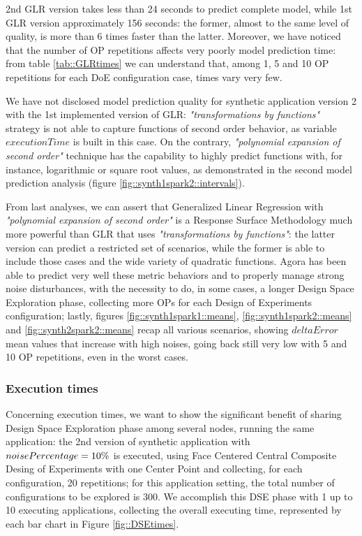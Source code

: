 2nd GLR version takes less than 24 seconds to predict complete model, while 1st GLR version approximately 156 seconds: the former, almost to the same level of quality, is more than 6 times faster than the latter. Moreover, we have noticed that the number of OP repetitions affects very poorly model prediction time: from table \ref{tab::GLRtimes} we can understand that, among 1, 5 and 10 OP repetitions for each DoE configuration case, times vary very few.

We have not disclosed model prediction quality for synthetic application version 2 with the 1st implemented version of GLR: \textit{"transformations by functions"} strategy is not able to capture functions of second order behavior, as variable $executionTime$ is built in this case. On the contrary, \textit{"polynomial expansion of second order"} technique has the capability to highly predict functions with, for instance, logarithmic or square root values, as demonstrated in the second model prediction analysis (figure \ref{fig::synth1spark2::intervals}).

From last analyses, we can assert that Generalized Linear Regression with \textit{"polynomial expansion of second order"} is a Response Surface Methodology much more powerful than GLR that uses \textit{"transformations by functions"}: the latter version can predict a restricted set of scenarios, while the former is able to include those cases and the wide variety of quadratic functions. Agora has been able to predict very well these metric behaviors and to properly manage strong noise disturbances, with the necessity to do, in some cases, a longer Design Space Exploration phase, collecting more OPs for each Design of Experiments configuration; lastly, figures \ref{fig::synth1spark1::means}, \ref{fig::synth1spark2::means} and \ref{fig::synth2spark2::means} recap all various scenarios, showing $deltaError$ mean values that increase with high noises, going back still very low with 5 and 10 OP repetitions, even in the worst cases.


\subsubsection{Execution times}

Concerning execution times, we want to show the significant benefit of sharing Design Space Exploration phase among several nodes, running the same application: the 2nd version of synthetic application with $noise\-Percentage = 10\%$ is executed, using Face Centered Central Composite Desing of Experiments with one Center Point and collecting, for each configuration, 20 repetitions; for this application setting, the total number of configurations to be explored is 300. We accomplish this DSE phase with 1 up to 10 executing applications, collecting the overall executing time, represented by each bar chart in Figure \ref{fig::DSEtimes}.

